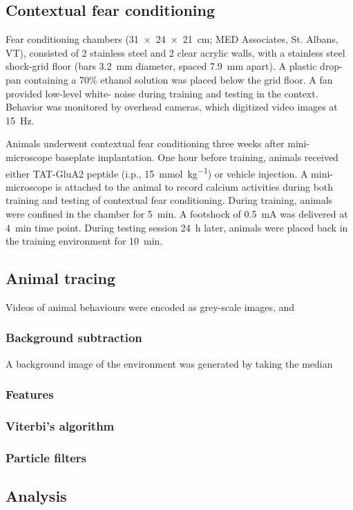 \subsection{Contextual fear conditioning}
Fear conditioning chambers (\SI{31 x 24 x 21}{\cm}; MED Associates, St. Albans, VT), consisted of 2 stainless steel and 2 clear acrylic walls, with a stainless steel shock-grid floor (bars \SI{3.2}{\mm} diameter, spaced \SI{7.9}{\mm} apart). A plastic drop-pan containing a 70\% ethanol solution was placed below the grid floor. A fan provided low-level white- noise during training and testing in the context. Behavior was monitored by overhead cameras, which digitized video images at \SI{15}{\Hz}. 

Animals underwent contextual fear conditioning three weeks after mini-microscope baseplate implantation. One hour before training, animals received either TAT-GluA2 peptide (i.p., \SI{15}{\mmol\per\kg}) or vehicle injection. A mini-microscope is attached to the animal to record calcium activities during both training and testing of contextual fear conditioning. During training, animals were confined in the chamber for \SI{5}{\minute}. A footshock of \SI{0.5}{\mA} was delivered at \SI{4}{\minute} time point. During testing session \SI{24}{\hour} later, animals were placed back in the training environment for \SI{10}{\minute}. 

\subsection{Animal tracing}
Videos of animal behaviours were encoded as grey-scale images, and 
\subsubsection{Background subtraction}
A background image of the environment was generated by taking the median 
\subsubsection{Features}
\subsubsection{Viterbi's algorithm}
\subsubsection{Particle filters}

\subsection{Analysis}

